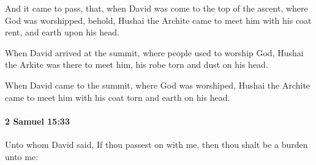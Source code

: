 			\begin{versebox}
					\item[BHS] 
					\item[ASV] And it came to pass, that, when David was come to the top of the ascent, where God was worshipped, behold, Hushai the Archite came to meet him with his coat rent, and earth upon his head.
					\item[NIV] When David arrived at the summit, where people used to worship God, Hushai the Arkite was there to meet him, his robe torn and dust on his head.
					\item[NRSV] When David came to the summit, where God was worshiped, Hushai the Archite came to meet him with his coat torn and earth on his head.
			\end{versebox}

		\paragraph{2 Samuel 15:33} %
			\label{2SAMUEL-15-33}

			Unto whom David said, If thou passest on with me, then thou shalt be a burden unto me:

